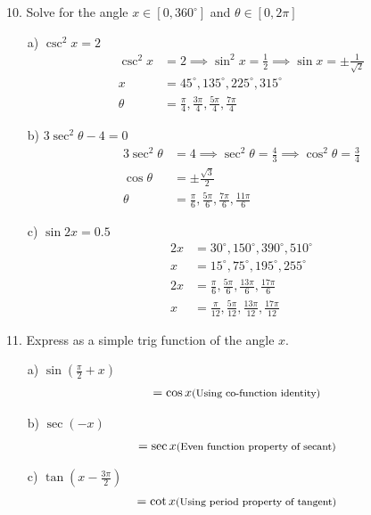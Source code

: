 \documentclass{article}
\newcommand{\smalltext}[1]{\text{\footnotesize #1}}
\begin{document}
10. Solve for the angle \( x \in [0, 360^{\circ}] \) and \( \theta \in [0, 2\pi] \)
\begin{enumerate}
    \item[a)] \( \csc^2 x = 2 \)
    \begin{align*}
        \csc^2 x &= 2 \implies \sin^2 x = \frac{1}{2} \implies \sin x = \pm \frac{1}{\sqrt{2}} \\
        x &= 45^{\circ}, 135^{\circ}, 225^{\circ}, 315^{\circ} \\
        \theta &= \frac{\pi}{4}, \frac{3\pi}{4}, \frac{5\pi}{4}, \frac{7\pi}{4}
    \end{align*}
    \item[b)] \( 3\sec^2 \theta - 4 = 0 \)
    \begin{align*}
        3\sec^2 \theta &= 4 \implies \sec^2 \theta = \frac{4}{3} \implies \cos^2 \theta = \frac{3}{4} \\
        \cos \theta &= \pm \frac{\sqrt{3}}{2} \\
        \theta &= \frac{\pi}{6}, \frac{5\pi}{6}, \frac{7\pi}{6}, \frac{11\pi}{6}
    \end{align*}
    \item[c)] \( \sin 2x = 0.5 \)
    \begin{align*}
        2x &= 30^{\circ}, 150^{\circ}, 390^{\circ}, 510^{\circ} \\
        x &= 15^{\circ}, 75^{\circ}, 195^{\circ}, 255^{\circ} \\
        2x &= \frac{\pi}{6}, \frac{5\pi}{6}, \frac{13\pi}{6}, \frac{17\pi}{6} \\
        x &= \frac{\pi}{12}, \frac{5\pi}{12}, \frac{13\pi}{12}, \frac{17\pi}{12}
    \end{align*}
\end{enumerate}

11. Express as a simple trig function of the angle \( x \).
\begin{enumerate}
    \item[a)] \( \sin \left(\frac{\pi}{2} + x\right) \)
    \begin{align*}
        &= \cos x \smalltext{ (Using co-function identity)}
    \end{align*}
    \item[b)] \( \sec(-x) \)
    \begin{align*}
        &= \sec x \smalltext{ (Even function property of secant)}
    \end{align*}
    \item[c)] \( \tan \left(x - \frac{3\pi}{2}\right) \)
    \begin{align*}
        &= \cot x \smalltext{ (Using period property of tangent)}
    \end{align*}
\end{enumerate}
\end{document}
